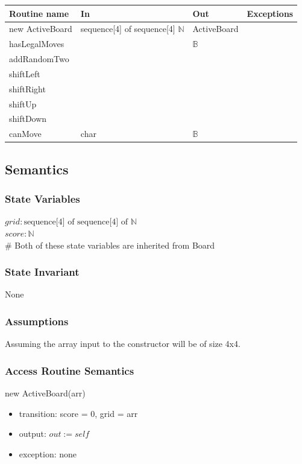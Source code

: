 \documentclass[12pt]{article}
\begin{document}
\begin{tabular}{| l | l | l | p{5cm} |}
\hline
\textbf{Routine name} & \textbf{In} & \textbf{Out} & \textbf{Exceptions}\\
\hline
new ActiveBoard & sequence[4] of sequence[4] $\mathbb{N}$ & ActiveBoard &~\\
\hline
hasLegalMoves & & $\mathbb{B}$ &~\\
\hline
addRandomTwo & & &~\\
\hline
shiftLeft & & &~\\
\hline
shiftRight & & &~\\
\hline
shiftUp & & &~\\
\hline
shiftDown & & &~\\
\hline
canMove & char & $\mathbb{B}$ &~\\
\hline
\end{tabular}

\subsection*{Semantics}

\subsubsection*{State Variables}

$\mathit{grid}: \text{sequence[4] of sequence[4] of } \mathbb{N}$\\
$\mathit{score}: \mathbb{N}$ \\
\# Both of these state variables are inherited from Board

\subsubsection*{State Invariant}

None

\subsubsection*{Assumptions}

Assuming the array input to the constructor will be of size 4x4.

\subsubsection*{Access Routine Semantics}

\noindent new ActiveBoard(arr)
\begin{itemize}
    \item transition: score = 0, grid = arr
    \item output: $out := self$
    \item exception: none
\end{itemize}
\end{document}
